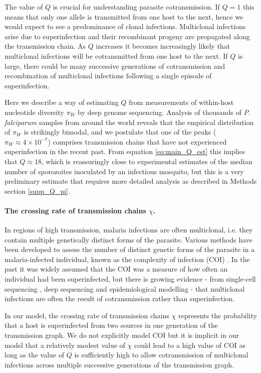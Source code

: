 \documentclass[_main.tex]{subfiles}
\begin{document}
The value of $Q$ is crucial for understanding parasite cotransmission.  If $Q=1$ this means that only one allele is transmitted from one host to the next, hence we would expect to see a predominance of clonal infections.  Multiclonal infections arise due to superinfection and their recombinant progeny are propagated along the transmission chain.  As $Q$ increases it becomes increasingly likely that multiclonal infections will be cotransmitted from one host to the next.  If $Q$ is large, there could be many successive generations of cotransmission and recombination of multiclonal infections following a single episode of superinfection.

Here we describe a way of estimating $Q$ from measurements of within-host nucleotide diversity $\pi_W$ by deep genome sequencing.  Analysis of thousands of \textit{P. falciparum} samples from around the world reveals that the empirical distribution of $\pi_W$ is strikingly bimodal, and we postulate that one of the peaks ($\pi_W \approx 4 \times 10^{-7}$) comprises transmission chains that have not experienced superinfection in the recent past.  From equation \ref{eq:main_Q_est} this implies that $Q \approx 18$, which is reassuringly close to experimental estimates of the median number of sporozoites inoculated by an infectious mosquito, but this is a very preliminary estimate that requires more detailed analysis as described in Methods section \ref{supp_Q_pi}.

\paragraph{The crossing rate of transmission chains $\chi$.}  In regions of high transmission, malaria infections are often multiclonal, i.e. they contain multiple genetically distinct forms of the parasite.  Various methods have been developed to assess the number of distinct genetic forms of the parasite in a malaria-infected individual, known as the complexity of infection (COI) \cite{Thaithong1984,Viriyakosol1995,Galinsky2015,Chang2017}.  In the past it was widely assumed that the COI was a measure of how often an individual had been superinfected, but there is growing evidence - from single-cell sequencing \cite{Nkhoma2020}, deep sequencing \cite{Zhu2019} and epidemiological modelling \cite{Watson2020} - that multiclonal infections are often the result of cotransmission rather than superinfection.

In our model, the crossing rate of transmission chains $\chi$ represents the probability that a host is superinfected from two sources in one generation of the transmission graph. We do not explicitly model COI but it is implicit in our model that a relatively modest value of $\chi$ could lead to a high value of COI as long as the value of $Q$ is sufficiently high to allow cotransmission of multiclonal infections across multiple successive generations of the transmission graph.
\end{document}
